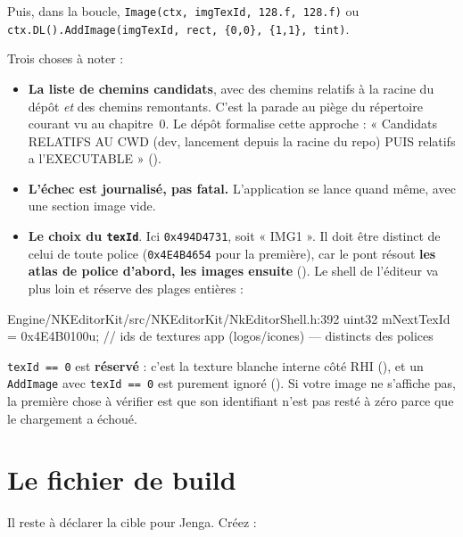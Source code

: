 Puis, dans la boucle, \texttt{Image(ctx, imgTexId, 128.f, 128.f)} ou
\texttt{ctx.DL().AddImage(imgTexId, rect, \{0,0\}, \{1,1\}, tint)}.

Trois choses à noter :

\begin{itemize}
  \item \textbf{La liste de chemins candidats}, avec des chemins relatifs à la
        racine du dépôt \emph{et} des chemins remontants. C'est la parade au
        piège du répertoire courant vu au chapitre~0. Le dépôt formalise cette
        approche : « Candidats RELATIFS AU CWD (dev, lancement depuis la racine
        du repo) PUIS relatifs a l'EXECUTABLE »
        ().
  \item \textbf{L'échec est journalisé, pas fatal.} L'application se lance quand
        même, avec une section image vide.
  \item \textbf{Le choix du \texttt{texId}}. Ici \texttt{0x494D4731}, soit
        « IMG1 ». Il doit être distinct de celui de toute police
        (\texttt{0x4E4B4654} pour la première), car le pont résout
        \textbf{les atlas de police d'abord, les images ensuite}
        (). Le shell de l'éditeur va plus
        loin et réserve des plages entières :
\end{itemize}

\begin{nkcode}{Engine/NKEditorKit/src/NKEditorKit/NkEditorShell.h:392}
uint32 mNextTexId = 0x4E4B0100u;  // ids de textures app (logos/icones) — distincts des polices
\end{nkcode}

\begin{nkretenir}
\texttt{texId == 0} est \textbf{réservé} : c'est la texture blanche interne côté
RHI (), et un
\texttt{AddImage} avec \texttt{texId == 0} est purement ignoré
(). Si votre image ne s'affiche pas, la
première chose à vérifier est que son identifiant n'est pas resté à zéro parce
que le chargement a échoué.
\end{nkretenir}

\section{Le fichier de build}

Il reste à déclarer la cible pour Jenga. Créez
 :

